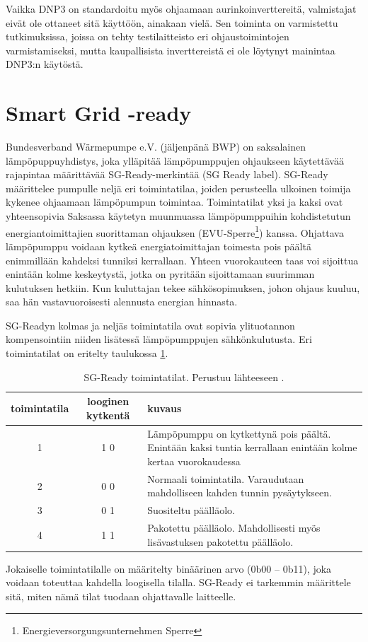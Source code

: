   Vaikka DNP3 on standardoitu myös ohjaamaan aurinkoinverttereitä, valmistajat eivät ole ottaneet sitä käyttöön, ainakaan vielä. Sen toiminta on varmistettu tutkimuksissa, joissa on tehty testilaitteisto eri ohjaustoimintojen varmistamiseksi, mutta kaupallisista inverttereistä ei ole löytynyt mainintaa DNP3:n käytöstä. \parencite{DNP3inv}


\section{Smart Grid -ready}

  Bundesverband Wärmepumpe e.V. (jäljenpänä BWP) on saksalainen lämpöpuppuyhdistys, joka ylläpitää lämpöpumppujen ohjaukseen käytettävää rajapintaa määrittävää \gls{SG}-Ready-merkintää (\gls{SG} Ready label). \gls{SG}-Ready määrittelee pumpulle neljä eri toimintatilaa, joiden perusteella ulkoinen toimija kykenee ohjaamaan lämpöpumpun toimintaa. Toimintatilat yksi ja kaksi ovat yhteensopivia Saksassa käytetyn muunmuassa lämpöpumppuihin kohdistetutun energiantoimittajien suorittaman ohjauksen (EVU-Sperre\footnote{Energieversorgungsunternehmen Sperre}) kanssa.\parencite{SGReadyReg} Ohjattava lämpöpumppu voidaan kytkeä energiatoimittajan toimesta pois päältä enimmillään kahdeksi tunniksi kerrallaan. Yhteen vuorokauteen taas voi sijoittua enintään kolme keskeytystä, jotka on pyritään sijoittamaan suurimman kulutuksen hetkiin. Kun kuluttajan tekee sähkösopimuksen, johon ohjaus kuuluu, saa hän vastavuoroisesti alennusta energian hinnasta. \parencite{enwg, VDEARN4100}

  SG-Readyn  kolmas ja neljäs toimintatila ovat sopivia ylituotannon kompensointiin niiden lisätessä lämpöpumppujen sähkönkulutusta. Eri toimintatilat on eritelty taulukossa \ref{sgready}.
  \begin{table}[h]
    \centering
    \caption[\gls{SG}-Ready toimintatilat]{\gls{SG}-Ready toimintatilat. Perustuu lähteeseen \parencite{SGReadyReg}.}
    \begin{tabular}{|c|c|p{3in}|}
      \hline
      \rowcolor{lightgray} toimintatila & looginen kytkentä & kuvaus \\\hline
      1 & 1 0 & Lämpöpumppu on kytkettynä pois päältä. Enintään kaksi tuntia kerrallaan enintään kolme kertaa vuorokaudessa \\\hline
      2 & 0 0 & Normaali toimintatila. Varaudutaan mahdolliseen kahden tunnin pysäytykseen. \\\hline
      3 & 0 1 & Suositeltu päälläolo. \\ \hline
      4 & 1 1 & Pakotettu päälläolo. Mahdollisesti myös lisävastuksen pakotettu päälläolo. \\\hline
    \end{tabular}
    \label{sgready}
  \end{table}
  Jokaiselle toimintatilalle on määritelty binäärinen arvo (0b00 -- 0b11), joka voidaan toteuttaa kahdella loogisella tilalla. SG-Ready ei tarkemmin määrittele sitä, miten nämä tilat tuodaan ohjattavalle laitteelle. \parencite{SGReadyReg}

